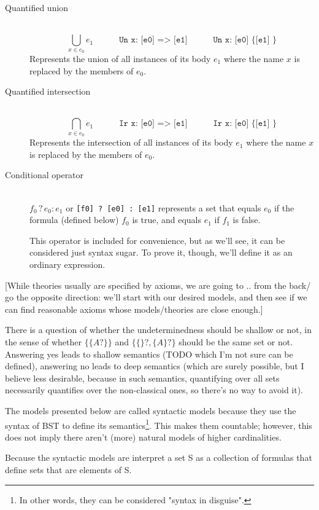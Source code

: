 \documentclass[oneside,12pt]{book}
\newcounter{question}
\theoremstyle{definition}
\theoremstyle{remark}
\newcommand{\conditional}[3]{#1 \mathrel{?} #2 : #3}
\begin{document}
\begin{description}
  \item[Quantified union] \hfill \\
    \[\bigcup_{x \in e_0}e_1\quad\quad\quad\texttt{Un x: [e0] => [e1]}
    \quad\quad\quad\texttt{Un x: [e0] \{ [e1] \}}\]
    Represents the union of all instances of its body $e_1$ where the name
    $x$ is replaced by the members of $e_0$.
  \item[Quantified intersection] \hfill \\
    \[\bigcap_{x \in e_0}e_1\quad\quad\quad\texttt{Ir x: [e0] => [e1]}
    \quad\quad\quad\texttt{Ir x: [e0] \{ [e1] \}}\]
    Represents the intersection of all instances of its body $e_1$ where the name
    $x$ is replaced by the members of $e_0$.
    
  \item[Conditional operator] \hfill \\
    $\conditional{f_0}{e_0}{e_1}$ or \texttt{[f0] ? [e0] : [e1]} represents a set
    that equals $e_0$ if the formula (defined below) $f_0$ is true, and equals
    $e_1$ if $f_1$ is false.
    
    This operator is included for convenience, but as we'll see, it can be considered
    just syntax sugar. To prove it, though, we'll define it as an ordinary expression.
\end{description}

[While theories usually are specified by axioms, we are going to .. from the back/
go the opposite direction: we'll start with our desired models, and then see
if we can find reasonable axioms whose models/theories are close enough.]

There is a question of whether the undeterminedness should be shallow or not,
in the sense of whether $\{ \{ A? \} \}$ and $\{ \{\}?, \{ A \}? \}$ should be
the same set or not. Answering yes leads to shallow semantics (TODO which I'm not
sure can be defined), answering no leads to deep semantics (which are surely possible,
but I believe less desirable, because in such semantics, quantifying over all sets
necessarily quantifies over the non-classical ones, so there's no way to avoid it).

The models presented below are called syntactic models because they use the syntax
of BST to define its semantics\footnote{In other words, they can be considered
"syntax in disguise".}. This makes them countable; however, this does not imply
there aren't (more) natural models of higher cardinalities.

Because the syntactic models are
interpret a set S as a collection of formulas that define sets that are elements of S.
\end{document}
